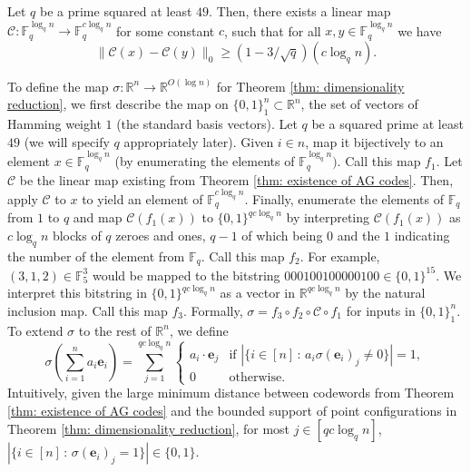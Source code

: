 \documentclass{theoretics}
\newcommand{\R}{\mathbb{R}}
\newcommand{\1}{\textbf{1}}
\newcommand{\e}{\mathbf{e}}
\begin{document}
\begin{theorem} \label{thm: existence of AG codes}
Let $q$ be a prime squared at least $49$. Then, there exists a linear map $\mathcal{C} : \mathbb{F}_q^{\log_q n} \to \mathbb{F}_q^{c \log_q n}$ for some constant $c$, such that for all $x, y \in \mathbb{F}_q^{\log_q n}$ we have
\[
\| \mathcal{C}(x) - \mathcal{C}(y)\|_0 \geq (1 - 3/\sqrt{q})(c \log_q n).
\]  
\end{theorem}
%
To define the map $\sigma: \R^n \to \R^{O(\log n)}$ for Theorem \ref{thm: dimensionality reduction}, we first describe the map on $\{0,1\}^n_1 \subset \R^n$, the set of vectors of Hamming weight $1$ (the standard basis vectors).  Let $q$ be a squared prime at least $49$ (we will specify $q$ appropriately later). Given $i \in n$, map it bijectively to an element $x \in \mathbb{F}_q^{\log_q n}$ (by enumerating the elements of $\mathbb{F}_q^{\log _q n})$. Call this map $f_1$. Let $\mathcal{C}$ be the linear map existing from Theorem \ref{thm: existence of AG codes}. Then, apply $\mathcal{C}$ to $x$ to yield an element of  $\mathbb{F}_q^{c \log_q n}$. Finally, enumerate the elements of $\mathbb{F}_q$ from $1$ to $q$ and map $\mathcal{C}(f_1(x))$ to $\{0,1\}^{qc \log_q n}$ by interpreting  $\mathcal{C}(f_1(x))$ as $c \log_q n$ blocks of $q$ zeroes and ones, $q-1$ of which being $0$ and the $1$ indicating the number of the element from $\mathbb{F}_q$. Call this map $f_2$. For example, $(3,1,2) \in \mathbb{F}_5^3$ would be mapped to the bitstring $000100100000100 \in \{0,1\}^{15}$. We interpret this bitstring in $\{0,1\}^{qc \log_q n}$ as a vector in $\mathbb{R}^{qc \log_q n}$ by the natural inclusion map. Call this map $f_3$. Formally, $\sigma = f_3 \circ f_2 \circ \mathcal{C} \circ f_1$ for inputs in $\{0,1\}^n_1$. 
%
%
To extend $\sigma$ to the rest of $\R^n$, we define
\[
\sigma \left(\sum_{i = 1}^n a_i \e_i \right) = \sum_{j = 1}^{qc \log_q n} \begin{cases}
a_i \cdot \e_j &\text{if } |\{i \in [n] \,:\, a_i \sigma(\e_i)_j \neq 0\}| = 1, \\
0 &\text{otherwise}.
\end{cases}
\]
 Intuitively, given the large minimum distance between codewords from Theorem \ref{thm: existence of AG codes} and the bounded support of point configurations in Theorem \ref{thm: dimensionality reduction}, for most $j \in [qc \log_q n]$, $|\{i \in [n] \,:\, \sigma(\e_i)_j = 1\}| \in \{0,1\}$. 
\end{document}
